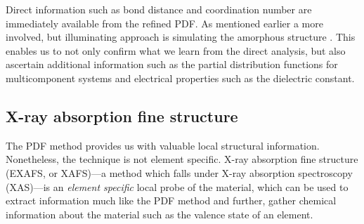 Direct information such as bond distance and coordination number are immediately available from the refined PDF. As mentioned earlier a more involved, but illuminating approach is simulating the amorphous structure \cite{Zhang2007, Bassiri2011}. This enables us to not only confirm what we learn from the direct analysis, but also ascertain additional information such as the partial distribution functions for multicomponent systems and electrical properties such as the dielectric constant.

\subsection{X-ray absorption fine structure}

The PDF method provides us with valuable local structural information. Nonetheless, the technique is not element specific. X-ray absorption fine structure (EXAFS, or XAFS)---a method which falls under X-ray absorption spectroscopy (XAS)---is an \emph{element specific} local probe of the material, which can be used to extract information much like the PDF method and further, gather chemical information about the material such as the valence state of an element. 

